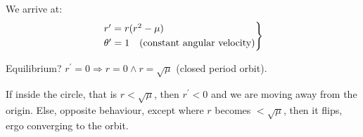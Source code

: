 \noindent We arrive at:
\begin{equation*}
  \begin{gathered}
    \begin{rcases*}
      r^{\prime} = r(r^2-\mu)\\
      \theta^{\prime} = 1\quad\text{(constant angular velocity)}
    \end{rcases*}
  \end{gathered}
\end{equation*}
\par\bigskip
\noindent Equilibrium? $r^{\prime}=0\Rightarrow r=0\wedge r = \sqrt{\mu}$ (closed period orbit).\par
\noindent If inside the circle, that is $r<\sqrt{\mu}$, then $r^{\prime}<0$ and we are moving away from the origin. Else, opposite behaviour, except where $r$ becomes $<\sqrt{\mu}$, then it flips, ergo converging to the orbit.
